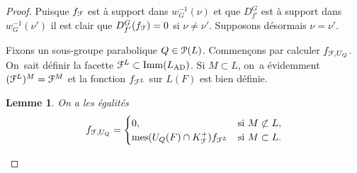 \documentclass[11pt]{article}
\numberwithin{equation}{section}\providecommand{\og}{«\,}\providecommand{\fg}{\,»}
\let\mathcal \EuScript
\newcommand{\AD}{\mathrm{AD}}
\newcommand{\Imm}{\mathrm{Imm}}
\DeclareMathOperator{\mes}{mes}
\newcommand{\cF}{\mathcal{F}}
\newcommand{\cP}{\mathcal{P}}
\theoremstyle{plain}
\newtheorem{lem}{Lemme}
\theoremstyle{definition}
\begin{document}
\begin{proof}
Puisque $f_{\cF}$ est à support dans $w_{G}^{-1}(\nu)$ et que $D^G_{f'}$ est à support dans $w_{G}^{-1}(\nu')$ il est clair que $D^G_{f'}(f_{\cF})=0$ si $\nu\neq\nu'$. Supposons désormais $\nu=\nu'$.

Fixons un sous-groupe parabolique $Q\in \cP(L)$. Commençons par calculer $f_{\cF,U_{Q}}$. On~sait définir la facette $\cF^L\subset \Imm(L_{\AD})$. Si $M\subset L$, on~a évidemment $(\cF^L)^M=\cF^M$ et la fonction $f_{\cF^L}$ sur $L(F)$ est bien définie.

\begin{lem}\label{lem1}
On a les égalités
\[
f_{\cF,U_{Q}}=\begin{cases}0,&\text{si } M\not\subset L,\\
\mes(U_{Q}(F)\cap K_{\cF}^+)f_{\cF^L}&\text{si } M\subset L. \end{cases}
\]
\end{lem}


\end{proof}
\end{document}
